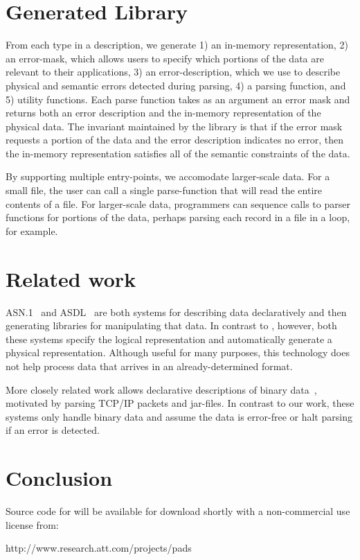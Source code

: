\documentclass[10pt]{article}
\begin{document}
\section{Generated Library}
From each type in a \pads{} description, we generate 
1) an in-memory representation, 
2) an error-mask, which allows users to specify
which portions of the data are relevant to their applications,
3) an error-description, which we use to describe physical and
semantic errors detected during parsing, 
4) a parsing function, and 
5) utility functions.
Each parse function takes as an argument an error mask and returns
both an error description and the in-memory representation of the
physical data.  
The invariant maintained by the library is that if the error mask
requests a portion of the data and the error description indicates no
error, then the in-memory representation satisfies all of the semantic
constraints of the data. 

By supporting multiple entry-points, we accomodate larger-scale data.
For a small file, the user can call a single parse-function that will
read the entire contents of a file.  For larger-scale data, programmers
can sequence calls to parser functions for portions of the data,
perhaps parsing each record in a file in a loop, for example. 


\section{Related work}
\textsc{ASN.1}~\cite{asn} and \textsc{ASDL}~\cite{asdl} are both
systems for describing data declaratively and then generating
libraries for manipulating that data.  In contrast to \pads{},
however, both these systems specify the logical representation and
automatically generate a physical representation.  Although useful for
many purposes, this technology does not help process data that arrives
in an already-determined format. 

More closely related work allows declarative descriptions of binary
data~\cite{sigcomm00,erlang-bit-syntax,gpce02}, motivated by parsing
\textsc{TCP/IP} packets and \java{} jar-files.  In contrast to our
work, these systems only handle binary data and assume the data is
error-free or halt parsing if an error is detected.  

\section{Conclusion}
Source code for \pads{} will be available for download shortly with
a non-commercial use license from: 
\begin{centercode}
http://www.research.att.com/projects/pads
\end{centercode}
 

\end{document}

